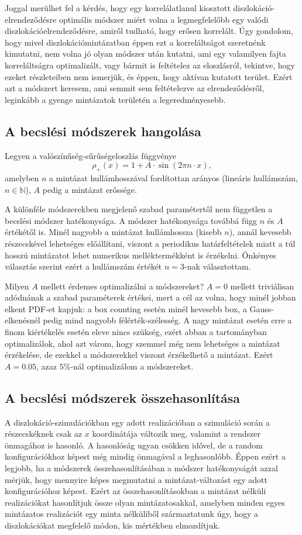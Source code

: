 \documentclass[10pt,a4paper]{scrartcl}
\begin{document}
Joggal merülhet fel a kérdés, hogy egy korrelálatlanul kiosztott diszlokáció-elrendeződésre optimális módszer miért volna a legmegfelelőbb egy valódi diszlokációelrendeződésre, amiről tudható, hogy erősen korrelált. Úgy gondolom, hogy mivel diszlokációmintázatban éppen ezt a korreláltságot szeretnénk kimutatni, nem volna jó olyan módszer után kutatni, ami egy valamilyen fajta korreláltságra optimalizált, vagy bármit is feltételez az eloszlásról, tekintve, hogy ezeket részleteiben nem ismerjük, és éppen, hogy aktívan kutatott terület. Ezért azt a módszert keresem, ami semmit sem feltételezve az elrendeződésről, leginkább a gyenge mintázatok területén a legeredményesebb.

\subsection{A becslési módszerek hangolása}
Legyen a valószínűség-sűrűségeloszlás függvénye
\[{\rho _ + }\left( x \right) = 1 + A \cdot \sin \left( {2\pi n \cdot x} \right),\]
amelyben $n$ a mintázat hullámhosszával fordítottan arányos (lineáris hullámszám, $n \in \mathbb{N}$), $A$ pedig a mintázat erőssége.

A különféle módszerekben megjelenő szabad paramétertől nem független a becslési módszer hatékonysága. A módszer hatékonysága továbbá függ $n$ és $A$ értékétől is. Minél nagyobb a mintázat hullámhossza (kisebb $n$), annál kevesebb részecskével lehetséges előállítani, viszont a periodikus határfeltételek miatt a túl hosszú mintázatot lehet numerikus melléktermékként is érzékelni. Önkényes választás szerint ezért a hullámszám értékét $n=3$-nak választottam.

Milyen $A$ mellett érdemes optimalizálni a módszereket? $A=0$ mellett triviálisan adódnának a szabad paraméterek értékei, mert a cél az volna, hogy minél jobban elkent PDF-et kapjuk: a box counting esetén minél kevesebb box, a Gauss-elkenésnél pedig mind nagyobb félérték-szélesség. A nagy mintázat esetén erre a finom kiértékelés esetén eleve nincs szükség, ezért abban a tartományban optimalizálok, ahol azt várom, hogy szemmel még nem lehetséges a mintázat érzékelése, de ezekkel a módszerekkel viszont érzékelhető a mintázat. Ezért $A=0.05$, azaz $5\%$-nál optimalizálom a módszereket.

\subsection{A becslési módszerek összehasonlítása}
A diszlokáció-szimulációkban egy adott realizációban a szimuláció során a részecskéknek csak az $x$ koordinátája változik meg, valamint a rendszer önmagához is hasonló. A hasonlóság ugyan csökken idővel, de a random konfigurációkhoz képest még mindig önmagával a leghasonlóbb. Éppen ezért a legjobb, ha a módszerek összehasonlításában a módszer hatékonyságát azzal mérjük, hogy mennyire képes megmutatni a mintázat-változást egy adott konfigurációhoz képest. Ezért az összehasonlításokban a mintázat nélküli realizációkat hasonlítjuk össze olyan mintázatosakkal, amelyben minden egyes mintázatos realizációt egy minta nélküliből származtatunk úgy, hogy a diszlokációkat megfelelő módon, kis mértékben elmozdítjuk.
\end{document}
